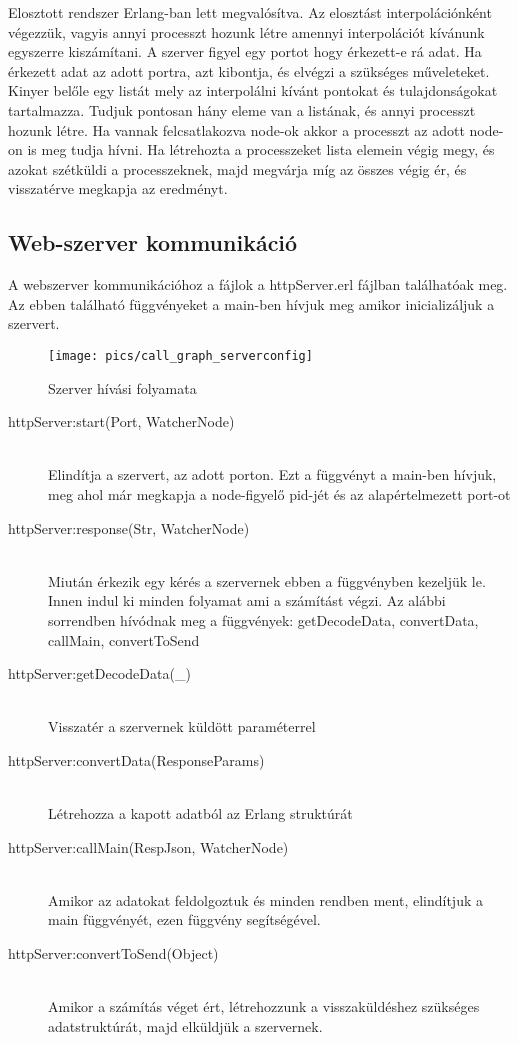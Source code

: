 Elosztott rendszer Erlang-ban lett megvalósítva. Az elosztást interpolációnként végezzük, vagyis annyi processzt hozunk létre amennyi interpolációt kívánunk egyszerre kiszámítani. \newline
A szerver figyel egy portot hogy érkezett-e rá adat. Ha érkezett adat az adott portra, azt kibontja, és elvégzi a szükséges műveleteket. Kinyer belőle egy listát mely az interpolálni kívánt pontokat és tulajdonságokat tartalmazza. \newline
Tudjuk pontosan hány eleme van a listának, és annyi processzt hozunk létre. Ha vannak felcsatlakozva node-ok akkor a processzt az adott node-on is meg tudja hívni.
Ha létrehozta a processzeket lista elemein végig megy, és azokat szétküldi a processzeknek, majd megvárja míg az összes végig ér, és visszatérve megkapja az eredményt.
\subsection{Web-szerver kommunikáció}
	A webszerver kommunikációhoz a fájlok a httpServer.erl fájlban találhatóak meg. Az ebben található függvényeket a main-ben hívjuk meg amikor inicializáljuk a szervert.

	\begin{figure}[h]
		\texttt{[image: pics/call\_graph\_serverconfig]}
		\centering
		\caption{Szerver hívási folyamata\label{fig:call_graph_serverconfig}}
	\end{figure}

	\begin{description}
	\item[httpServer:start(Port, WatcherNode)] 
		\hfill \\
		Elindítja a szervert, az adott porton. \newline
		Ezt a függvényt a main-ben hívjuk, meg ahol már megkapja a node-figyelő pid-jét és az alapértelmezett port-ot 
	\item[httpServer:response(Str, WatcherNode)] \hfill \\ 
		Miután érkezik egy kérés a szervernek ebben a függvényben kezeljük le. Innen indul ki minden folyamat ami a számítást végzi. \newline 
		Az alábbi sorrendben hívódnak meg a függvények: \newline
		getDecodeData, convertData, callMain, convertToSend
	\item[httpServer:getDecodeData(\_)] \hfill \\ 
		Visszatér a szervernek küldött paraméterrel
	\item[httpServer:convertData(ResponseParams)] \hfill \\ 
		Létrehozza a kapott adatból az Erlang struktúrát
	\item[httpServer:callMain(RespJson, WatcherNode)] \hfill \\ 
		Amikor az adatokat feldolgoztuk és minden rendben ment, elindítjuk a main függvényét, ezen függvény segítségével.
	\item[httpServer:convertToSend(Object)] \hfill \\ 
		Amikor a számítás véget ért, létrehozzunk a visszaküldéshez szükséges adatstruktúrát, majd elküldjük a szervernek.
	\end{description}
